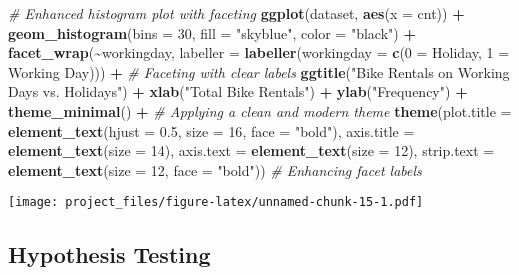 \documentclass[
]{article}
\newenvironment{Shaded}{\begin{snugshade}}{\end{snugshade}}
\newcommand{\AttributeTok}[1]{\textcolor[rgb]{0.13,0.29,0.53}{#1}}
\newcommand{\CommentTok}[1]{\textcolor[rgb]{0.56,0.35,0.01}{\textit{#1}}}
\newcommand{\DecValTok}[1]{\textcolor[rgb]{0.00,0.00,0.81}{#1}}
\newcommand{\FloatTok}[1]{\textcolor[rgb]{0.00,0.00,0.81}{#1}}
\newcommand{\FunctionTok}[1]{\textcolor[rgb]{0.13,0.29,0.53}{\textbf{#1}}}
\newcommand{\NormalTok}[1]{#1}
\newcommand{\OtherTok}[1]{\textcolor[rgb]{0.56,0.35,0.01}{#1}}
\newcommand{\SpecialCharTok}[1]{\textcolor[rgb]{0.81,0.36,0.00}{\textbf{#1}}}
\newcommand{\StringTok}[1]{\textcolor[rgb]{0.31,0.60,0.02}{#1}}
\begin{document}
\begin{Shaded}
\begin{Highlighting}[]
\CommentTok{\# Enhanced histogram plot with faceting}
\FunctionTok{ggplot}\NormalTok{(dataset, }\FunctionTok{aes}\NormalTok{(}\AttributeTok{x =}\NormalTok{ cnt)) }\SpecialCharTok{+} 
    \FunctionTok{geom\_histogram}\NormalTok{(}\AttributeTok{bins =} \DecValTok{30}\NormalTok{, }\AttributeTok{fill =} \StringTok{"skyblue"}\NormalTok{, }\AttributeTok{color =} \StringTok{"black"}\NormalTok{) }\SpecialCharTok{+} 
    \FunctionTok{facet\_wrap}\NormalTok{(}\SpecialCharTok{\textasciitilde{}}\NormalTok{workingday, }\AttributeTok{labeller =} \FunctionTok{labeller}\NormalTok{(}\AttributeTok{workingday =} \FunctionTok{c}\NormalTok{(}\StringTok{\textquotesingle{}0\textquotesingle{}} \OtherTok{=} \StringTok{\textquotesingle{}Holiday\textquotesingle{}}\NormalTok{, }\StringTok{\textquotesingle{}1\textquotesingle{}} \OtherTok{=} \StringTok{\textquotesingle{}Working Day\textquotesingle{}}\NormalTok{))) }\SpecialCharTok{+}  \CommentTok{\# Faceting with clear labels}
    \FunctionTok{ggtitle}\NormalTok{(}\StringTok{"Bike Rentals on Working Days vs. Holidays"}\NormalTok{) }\SpecialCharTok{+}
    \FunctionTok{xlab}\NormalTok{(}\StringTok{"Total Bike Rentals"}\NormalTok{) }\SpecialCharTok{+}
    \FunctionTok{ylab}\NormalTok{(}\StringTok{"Frequency"}\NormalTok{) }\SpecialCharTok{+}
    \FunctionTok{theme\_minimal}\NormalTok{() }\SpecialCharTok{+}  \CommentTok{\# Applying a clean and modern theme}
    \FunctionTok{theme}\NormalTok{(}\AttributeTok{plot.title =} \FunctionTok{element\_text}\NormalTok{(}\AttributeTok{hjust =} \FloatTok{0.5}\NormalTok{, }\AttributeTok{size =} \DecValTok{16}\NormalTok{, }\AttributeTok{face =} \StringTok{"bold"}\NormalTok{),}
          \AttributeTok{axis.title =} \FunctionTok{element\_text}\NormalTok{(}\AttributeTok{size =} \DecValTok{14}\NormalTok{),}
          \AttributeTok{axis.text =} \FunctionTok{element\_text}\NormalTok{(}\AttributeTok{size =} \DecValTok{12}\NormalTok{),}
          \AttributeTok{strip.text =} \FunctionTok{element\_text}\NormalTok{(}\AttributeTok{size =} \DecValTok{12}\NormalTok{, }\AttributeTok{face =} \StringTok{"bold"}\NormalTok{))  }\CommentTok{\# Enhancing facet labels}
\end{Highlighting}
\end{Shaded}

\texttt{[image: project\_files/figure-latex/unnamed-chunk-15-1.pdf]}

\subsection{Hypothesis Testing}\label{hypothesis-testing}
\end{document}
